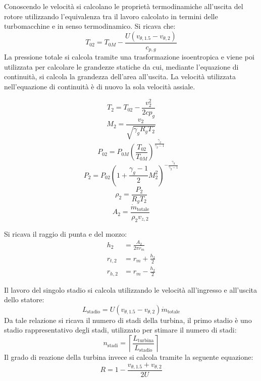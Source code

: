 Conoscendo le velocità si calcolano le proprietà termodinamiche all'uscita del rotore utilizzando l'equivalenza tra il lavoro calcolato in termini delle turbomacchine e in senso termodinamico. Si ricava che:
\begin{equation*}
T_{02} = T_{0M} - \frac{U (v_{\theta,1.5} - v_{\theta,2})}{c_{p,g}}
\end{equation*}
La pressione totale si calcola tramite una trasformazione isoentropica e viene poi utilizzata per calcolare le grandezze statiche da cui, mediante l'equazione di continuità, si calcola la grandezza dell'area all'uscita. La velocità utilizzata nell'equazione di continuità è di nuovo la sola velocità assiale.

\begin{equation*}
T_2 = T_{02} - \frac{v_2^2}{2cp_g}
\end{equation*}
\begin{equation*}
    M_2 = \frac{v_2}{\sqrt{\gamma_gR_gT_2}}
\end{equation*}
\begin{equation*}
    P_{02} = P_{0M} \left(\frac{T_{02}}{T_{0M}}\right)^{\frac{\gamma_g}{\gamma_g-1}}
\end{equation*}
\begin{equation*}
P_2= P_{02} \left( 1 + \frac{\gamma_g - 1}{2} M_2^2 \right)^{-\frac{\gamma_g}{\gamma_g - 1}} 
\end{equation*}
\begin{equation*}
    \rho_2 = \frac{P_2}{R_g T_2} 
\end{equation*}
\begin{equation*}
    A_2 = \frac{\dot{m}_\text{totale}}{\rho_2 v_{z,2}}
\end{equation*}

Si ricava il raggio di punta e del mozzo:
\begin{align*}
    h_{2} &= \frac{A_{2}}{2 \pi r_m} \\[6pt]
    r_{t,2} &= r_m + \frac{h_{2}}{2} \\[6pt]
r_{h,2} &= r_m - \frac{h_{2}}{2}
\end{align*}

Il lavoro del singolo stadio si calcola utilizzando le velocità all'ingresso e all'uscita dello statore:
\begin{equation*}
    L_{\text{stadio}} = U \left( v_{\theta,1.5} - v_{\theta,2} \right) \dot{m}_{\text{totale}}
\end{equation*}
Da tale relazione si ricava il numero di stadi della turbina, il primo stadio è uno stadio rappresentativo degli stadi, utilizzato per stimare il numero di stadi:
\begin{equation*}
    n_{\text{stadi}} = \left\lceil \frac{L_{\text{turbina}}}{L_{\text{stadio}}} \right\rceil 
\end{equation*}
Il grado di reazione della turbina invece si calcola tramite la seguente equazione:
\begin{equation*}
R = 1 - \frac{v_{\theta,1.5} + v_{\theta,2}}{2U}
\end{equation*}


